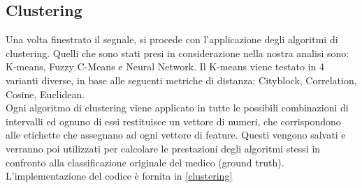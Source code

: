 %
\subsection{Clustering}
Una volta finestrato il segnale, si procede con l'applicazione degli algoritmi di clustering. Quelli che sono stati presi in considerazione nella nostra analisi sono: K-means, Fuzzy C-Means e Neural Network. Il K-means viene testato in 4 varianti diverse, in base alle seguenti metriche di distanza: Cityblock, Correlation, Cosine, Euclidean.\\
Ogni algoritmo di clustering viene applicato in tutte le possibili combinazioni di intervalli ed ognuno di essi restituisce un vettore di numeri, che corrispondono alle etichette che assegnano ad ogni vettore di feature. Questi vengono salvati e verranno poi utilizzati per calcolare le prestazioni degli algoritmi stessi in confronto alla classificazione originale del medico (ground truth). L'implementazione del codice è fornita in \ref{clustering}
